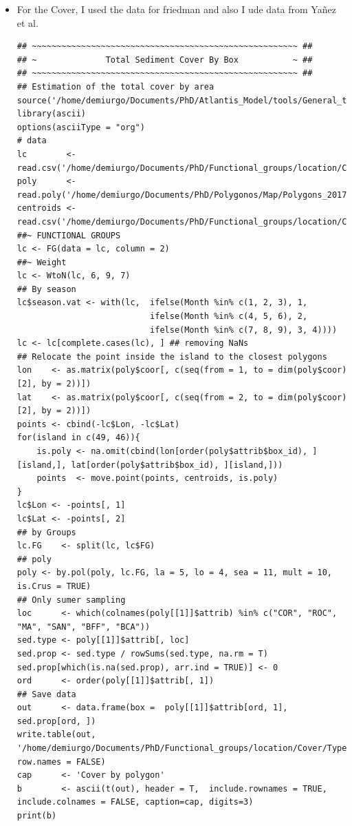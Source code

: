 \documentclass[11pt]{article}
\begin{document}
\begin{itemize}
\item For the Cover, I used the data for friedman and also I ude data from Yañez et al.

\begin{verbatim}
## ~~~~~~~~~~~~~~~~~~~~~~~~~~~~~~~~~~~~~~~~~~~~~~~~~~~~~~ ##
## ~              Total Sediment Cover By Box           ~ ##
## ~~~~~~~~~~~~~~~~~~~~~~~~~~~~~~~~~~~~~~~~~~~~~~~~~~~~~~ ##
## Estimation of the total cover by area
source('/home/demiurgo/Documents/PhD/Atlantis_Model/tools/General_tools/Atlantis_tools.R')
library(ascii)
options(asciiType = "org")
# data
lc        <- read.csv('/home/demiurgo/Documents/PhD/Functional_groups/location/Cover/Distribution.csv')
poly      <- read.poly('/home/demiurgo/Documents/PhD/Polygonos/Map/Polygons_20170510.csv')
centroids <- read.csv('/home/demiurgo/Documents/PhD/Functional_groups/location/Cover/centroids.csv')
##~ FUNCTIONAL GROUPS
lc <- FG(data = lc, column = 2)
##~ Weight
lc <- WtoN(lc, 6, 9, 7)
## By season
lc$season.vat <- with(lc,  ifelse(Month %in% c(1, 2, 3), 1,
                           ifelse(Month %in% c(4, 5, 6), 2,
                           ifelse(Month %in% c(7, 8, 9), 3, 4))))
lc <- lc[complete.cases(lc), ] ## removing NaNs
## Relocate the point inside the island to the closest polygons
lon    <- as.matrix(poly$coor[, c(seq(from = 1, to = dim(poly$coor)[2], by = 2))])
lat    <- as.matrix(poly$coor[, c(seq(from = 2, to = dim(poly$coor)[2], by = 2))])
points <- cbind(-lc$Lon, -lc$Lat)
for(island in c(49, 46)){
    is.poly <- na.omit(cbind(lon[order(poly$attrib$box_id), ][island,], lat[order(poly$attrib$box_id), ][island,]))
    points  <- move.point(points, centroids, is.poly)
}
lc$Lon <- -points[, 1]
lc$Lat <- -points[, 2]
## by Groups
lc.FG    <- split(lc, lc$FG)
## poly
poly <- by.pol(poly, lc.FG, la = 5, lo = 4, sea = 11, mult = 10, is.Crus = TRUE)
## Only sumer sampling
loc      <- which(colnames(poly[[1]]$attrib) %in% c("COR", "ROC", "MA", "SAN", "BFF", "BCA"))
sed.type <- poly[[1]]$attrib[, loc]
sed.prop <- sed.type / rowSums(sed.type, na.rm = T)
sed.prop[which(is.na(sed.prop), arr.ind = TRUE)] <- 0
ord      <- order(poly[[1]]$attrib[, 1])
## Save data
out      <- data.frame(box =  poly[[1]]$attrib[ord, 1], sed.prop[ord, ])
write.table(out, '/home/demiurgo/Documents/PhD/Functional_groups/location/Cover/Type.sed.csv', row.names = FALSE)
cap      <- 'Cover by polygon'
b        <- ascii(t(out), header = T,  include.rownames = TRUE, include.colnames = FALSE, caption=cap, digits=3)
print(b)
\end{verbatim}


\end{itemize}
\end{document}
